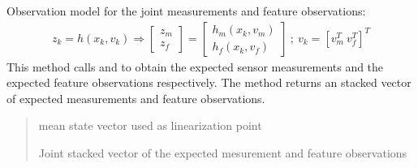\documentclass[letterpaper,10pt,english]{sphinxmanual}
\begin{document}
\begin{fulllineitems}
\begin{fulllineitems}
\label{\detokenize{FEKFMBLocalization:FEKFMBL.FEKFMBL.h}}
\pysigstartsignatures
{}
\pysigstopsignatures
\sphinxAtStartPar
Observation model for the joint measurements and feature observations:
\begin{equation}\label{equation:FEKFMBLocalization:eq-mblh}
\begin{split}z_k = h(x_k,v_k) \Rightarrow \begin{bmatrix} z_m \\ z_f \end{bmatrix} = \begin{bmatrix} h_m(x_k,v_m) \\ h_f(x_k,v_f) \end{bmatrix} ~;~ v_k=[v_m^T ~v_f^T]^T\end{split}
\end{equation}
\sphinxAtStartPar
This method calls {\hyperref[\detokenize{EKF:EKF.EKF.hm}]{}} and {\hyperref[\detokenize{FEKFMBLocalization:MapFeature.MapFeature.hf}]{}}
to obtain the expected sensor measurements and the expected feature observations respectively. The method returns an stacked vector of expected measurements and feature observations.
\begin{quote}\begin{description}
\sphinxAtStartPar
{} \textendash{} mean state vector used as linearization point

\sphinxAtStartPar
Joint stacked vector of the expected mesurement and feature observations

\end{description}\end{quote}

\end{fulllineitems}



\end{fulllineitems}
\end{document}
